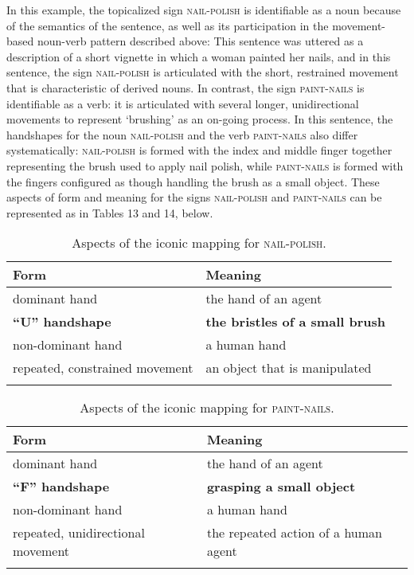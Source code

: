 \documentclass[output=paper,
modfonts
]{LSP/langsci}
\begin{document}
In this example, the topicalized sign \textsc{nail-polish} is identifiable as a noun because of the semantics of the sentence, as well as its participation in the movement-based noun-verb pattern described above: This sentence was uttered as a description of a short vignette in which a woman painted her nails, and in this sentence, the sign \textsc{nail-polish} is articulated with the short, restrained movement that is characteristic of derived nouns. In contrast, the sign \textsc{paint-nails} is identifiable as a verb: it is articulated with several longer, unidirectional movements to represent `brushing' as an on-going process. In this sentence, the handshapes for the noun \textsc{nail-polish} and the verb \textsc{paint-nails} also differ systematically: \textsc{nail-polish} is formed with the index and middle finger together representing the brush used to apply nail polish, while \textsc{paint-nails} is formed with the fingers configured as though handling the brush as a small object. These aspects of form and meaning for the signs \textsc{nail-polish} and \textsc{paint-nails} can be represented as in Tables 13 and 14, below.

\begin{table}
\caption{Aspects of the iconic mapping for \textsc{nail-polish}.}
\label{tab:13}
\begin{tabular}{ll}
\lsptoprule
Form & Meaning\\
\midrule
dominant hand & the hand of an agent\\

\textbf{``U'' handshape} & \textbf{the bristles of a small brush}\\

non-dominant hand & a human hand\\

repeated, constrained movement & an object that is manipulated\\
\lspbottomrule
\end{tabular}
\end{table}

\begin{table}
\caption{Aspects of the iconic mapping for \textsc{paint-nails}.}
\label{tab:14}
\begin{tabular}{ll}
\lsptoprule
Form & Meaning\\
\midrule
dominant hand & the hand of an agent\\

\textbf{``F'' handshape} & \textbf{grasping a small object}\\

non-dominant hand & a human hand\\

repeated, unidirectional movement & the repeated action of a human agent\\
\lspbottomrule
\end{tabular}
\end{table}
\end{document}
